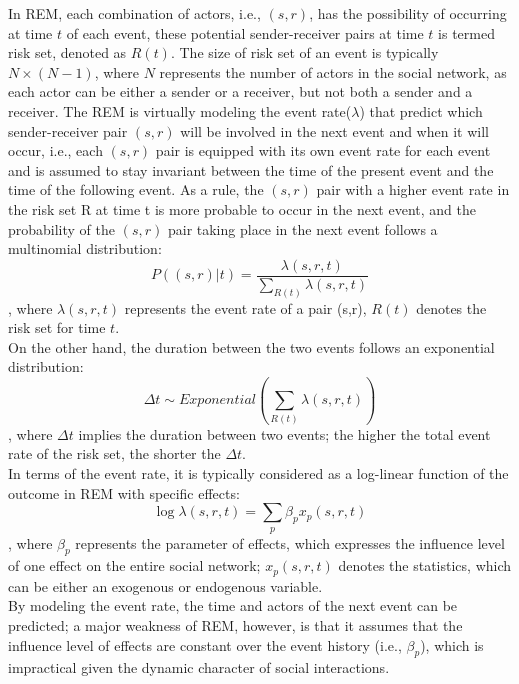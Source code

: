 \documentclass[]{interact}
\theoremstyle{plain}%
\theoremstyle{definition}
\theoremstyle{remark}
\begin{document}
{	In REM, each combination of actors, i.e., $(s,r)$, has the possibility of occurring at time $t$ of each event, these potential sender-receiver pairs at time $t$ is termed risk set, denoted as $R(t)$. The size of risk set of an event is typically $N \times (N-1)$, where $N$ represents the number of actors in the social network, as each actor can be either a sender or a receiver, but not both a sender and a receiver. The REM is virtually modeling the event rate($\lambda$) that predict which sender-receiver pair $(s,r)$ will be involved in the next event and when it will occur, i.e., each $(s,r)$ pair is equipped with its own event rate for each event and is assumed to stay invariant between the time of the present event and the time of the following event. As a rule, the $(s,r)$ pair with a higher event rate in the risk set R at time t is more probable to occur in the next event, and the probability of the $(s,r)$ pair taking place in the next event follows a multinomial distribution:
	\begin{equation} \label{1}
		P \left((s,r) | t \right) = \dfrac{\lambda(s,r,t)} {\sum_{R(t)} \lambda(s,r,t)}
	\end{equation}
	, where $\lambda(s,r,t)$ represents the event rate of a pair (s,r), $R(t)$ denotes the risk set for time $t$. \\
	
	On the other hand, the duration between the two events follows an exponential distribution: 
	\begin{equation} \label{2}
		\Delta t \sim Exponential \left(\sum_{R(t)} \lambda(s,r,t) \right)
	\end{equation}
	, where $\Delta t$ implies the duration between two events; the higher the total event rate of the risk set, the shorter the $\Delta t$. \\
	
	In terms of the event rate, it is typically considered as a log-linear function of the outcome in REM with specific effects:
	\begin{equation} \label{3}
		\log \lambda(s,r,t) = \sum_{p} \beta_p x_p(s,r,t)
	\end{equation}
	, where $\beta_p$ represents the parameter of effects, which expresses the influence level of one effect on the entire social network; $x_p(s,r,t)$ denotes the statistics, which can be either an exogenous or endogenous variable. \\
	
	By modeling the event rate, the time and actors of the next event can be predicted; a major weakness of REM, however, is that it assumes that the influence level of effects are constant over the event history (i.e., $\beta_p$), which is impractical given the dynamic character of social interactions.
	
}
\end{document}
